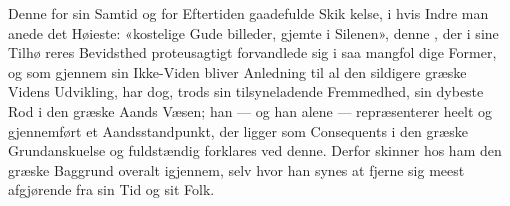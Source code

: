 Denne for sin Samtid og for Eftertiden gaadefulde Skik\-%
kelse, i hvis Indre man anede det Høieste: «kostelige Gude\-%
billeder, gjemte i Silenen», denne , der i sine Tilhø\-%
reres Bevidsthed proteusagtigt forvandlede sig i saa mangfol\-%
dige Former, og som gjennem sin Ikke-Viden bliver Anledning
til al den sildigere græske Videns Udvikling, har dog, trods
sin tilsyneladende Fremmedhed, sin dybeste Rod i den græske
Aands Væsen; han --- og han alene --- repræsenterer heelt og
gjennemført et Aandsstandpunkt, der ligger som Consequents
i den græske Grundanskuelse og fuldstændig forklares ved
denne. Derfor skinner hos ham den græske Baggrund overalt
igjennem, selv hvor han synes at fjerne sig meest afgjørende
fra sin Tid og sit Folk.

